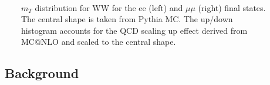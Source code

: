 \begin{figure}[!htbp]
\begin{center}
\\
\caption{$m_T$ distribution for WW for the ee (left) and $\mu\mu$ (right) final states. 
The central shape is taken from Pythia MC. The up/down histogram accounts for the QCD scaling up effect
derived from MC@NLO and scaled to the central shape. 
}
\label{fig:wwnlosyst_hzz}	
\end{center}
\end{figure}

\subsection{\dyll\  Background}

